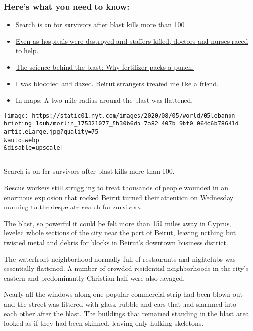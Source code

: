 \hypertarget{heres-what-you-need-to-know}{%
\subsubsection{Here's what you need to
know:}\label{heres-what-you-need-to-know}}

\begin{itemize}
\tightlist
\item
  \protect\hyperlink{link-480981c6}{Search is on for survivors after
  blast kills more than 100.}
\item
  \protect\hyperlink{link-a31c6f4}{Even as hospitals were destroyed and
  staffers killed, doctors and nurses raced to help.}
\item
  \protect\hyperlink{link-5d384d85}{The science behind the blast: Why
  fertilizer packs a punch.}
\item
  \protect\hyperlink{link-1fdae9ed}{I was bloodied and dazed. Beirut
  strangers treated me like a friend.}
\item
  \protect\hyperlink{link-1ba3fa3b}{In maps: A two-mile radius around
  the blast was flattened.}
\end{itemize}

\texttt{[image: https://static01.nyt.com/images/2020/08/05/world/05lebanon-briefing-1sub/merlin\_175321077\_5b30b6db-7a82-407b-9bf0-064c6b78641d-articleLarge.jpg?quality=75\\\&auto=webp\\\&disable=upscale]}

\subsection{}

Search is on for survivors after blast kills more than 100.

Rescue workers still struggling to treat thousands of people wounded in
an enormous explosion that rocked Beirut turned their attention on
Wednesday morning to the desperate search for survivors.

The blast, so powerful it could be felt more than 150 miles away in
Cyprus, leveled whole sections of the city near the port of Beirut,
leaving nothing but twisted metal and debris for blocks in Beirut's
downtown business district.

The waterfront neighborhood normally full of restaurants and nightclubs
was essentially flattened. A number of crowded residential neighborhoods
in the city's eastern and predominantly Christian half were also
ravaged.

Nearly all the windows along one popular commercial strip had been blown
out and the street was littered with glass, rubble and cars that had
slammed into each other after the blast. The buildings that remained
standing in the blast area looked as if they had been skinned, leaving
only hulking skeletons.

